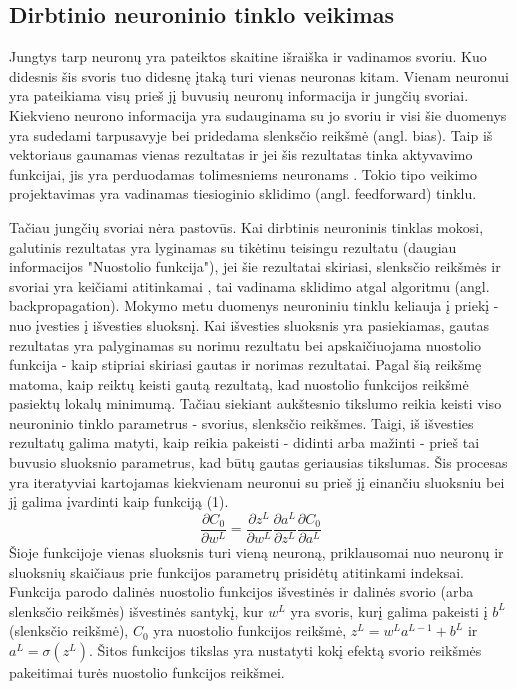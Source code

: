 \documentclass{VUMIFPSkursinis}
\begin{document}
\subsection{Dirbtinio neuroninio tinklo veikimas}
Jungtys tarp neuronų yra pateiktos skaitine išraiška ir vadinamos svoriu. Kuo didesnis šis svoris tuo didesnę įtaką turi vienas neuronas kitam.
Vienam neuronui yra pateikiama visų prieš jį buvusių neuronų informacija ir jungčių svoriai. Kiekvieno neurono informacija yra sudauginama su
jo svoriu ir visi šie duomenys yra sudedami tarpusavyje bei pridedama slenksčio reikšmė (angl. bias). Taip iš vektoriaus gaunamas vienas rezultatas ir jei šis rezultatas tinka aktyvavimo
funkcijai, jis yra perduodamas tolimesniems neuronams \cite{shiffman2012nature}. Tokio tipo veikimo projektavimas yra vadinamas tiesioginio sklidimo (angl. feedforward) tinklu.

Tačiau jungčių svoriai nėra pastovūs. Kai dirbtinis neuroninis tinklas mokosi, galutinis rezultatas yra lyginamas su tikėtinu teisingu rezultatu (daugiau informacijos "Nuostolio funkcija"), jei šie
rezultatai skiriasi, slenksčio reikšmės ir svoriai yra keičiami atitinkamai \cite{backpropogation}, tai vadinama sklidimo atgal algoritmu (angl. backpropagation).
Mokymo metu duomenys neuroniniu tinklu keliauja į priekį - nuo įvesties į išvesties sluoksnį. Kai išvesties sluoksnis yra pasiekiamas, gautas rezultatas yra palyginamas su norimu rezultatu bei 
apskaičiuojama nuostolio funkcija - kaip stipriai skiriasi gautas ir norimas rezultatai. Pagal šią reikšmę matoma, kaip reiktų keisti gautą rezultatą, kad nuostolio funkcijos reikšmė pasiektų lokalų 
minimumą. Tačiau siekiant aukštesnio tikslumo reikia keisti viso neuroninio tinklo parametrus - svorius, slenksčio reikšmes. Taigi, iš išvesties rezultatų galima matyti, kaip reikia pakeisti - 
didinti arba mažinti - prieš tai buvusio sluoksnio parametrus, kad būtų gautas geriausias tikslumas. Šis procesas yra iteratyviai kartojamas kiekvienam neuronui su prieš jį einančiu sluoksniu bei jį galima įvardinti kaip funkciją (1).
\begin{equation}
\frac{\partial{C_{0}}}{\partial{w^{L}}} = \frac{\partial{z^{L}}}{\partial{w^{L}}} \frac{\partial{a^{L}}}{\partial{z^{L}}} \frac{\partial{C_{0}}}{\partial{a^{L}}}
\end{equation}
Šioje funkcijoje vienas sluoksnis turi vieną neuroną, priklausomai nuo neuronų ir sluoksnių skaičiaus prie funkcijos parametrų prisidėtų atitinkami indeksai. Funkcija parodo dalinės nuostolio funkcijos 
išvestinės ir dalinės svorio (arba slenksčio reikšmės) išvestinės santykį, kur \(w^{L}\) yra svoris, kurį galima pakeisti į \(b^{L}\) (slenksčio reikšmė), \(C_{0}\) yra nuostolio funkcijos reikšmė, 
\(z^{L} = w^{L}a^{L-1}+b^{L}\) ir \(a^{L}=\sigma(z^{L})\). Šitos funkcijos tikslas yra nustatyti kokį efektą svorio reikšmės pakeitimai turės nuostolio funkcijos reikšmei.
\end{document}
